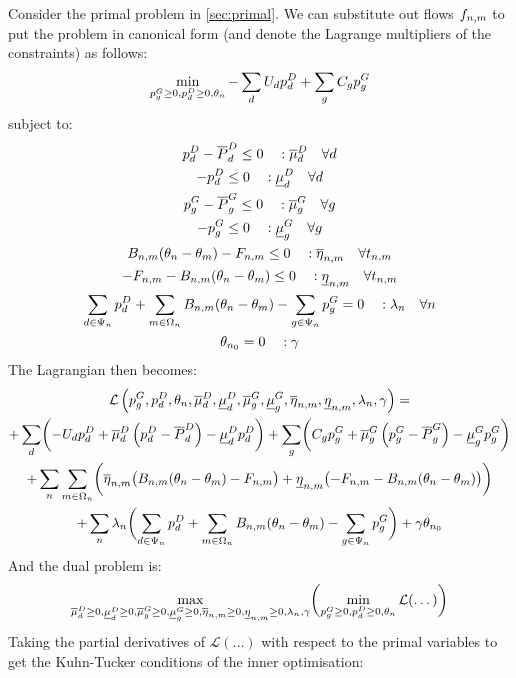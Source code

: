 \documentclass[11pt,a4paper]{article}
\numberwithin{equation}{section}
\begin{document}
Consider the primal problem in \cref{sec:primal}. We can substitute out flows $f_{n,m}$ to put the problem in canonical form (and denote the Lagrange multipliers of the constraints) as follows:
\begin{equation}
\min_{p^G_g \geq 0 ,p^D_d \geq 0,\theta_n} - \sum_d U_d p^D_d + \sum_g C_g p^G_g 
\end{equation}
subject to:
\begin{gather}
p^D_d - \overline{P}^D_d \leq 0 \quad : \overline{\mu}_d^D \quad \forall d  \label{eq:ineq_a} \\
- p^D_d \leq 0 \quad : \underline{\mu}_d^D \quad \forall d  \\
p^G_g - \overline{P}^G_g \leq 0 \quad : \overline{\mu}_g^G \quad \forall g  \\
- p^G_g \leq 0 \quad : \underline{\mu}_g^G \quad \forall g  \\
B_{n,m}(\theta_n - \theta_m) - F_{n,m} \leq 0 \quad : \overline{\eta}_{n,m} \quad \forall t_{n,m} \\
-F_{n,m} - B_{n,m}(\theta_n - \theta_m) \leq 0 \quad : \underline{\eta}_{n,m} \quad \forall t_{n,m} \label{eq:ineq_z} \\
\sum_{d \in \Psi_n} p^D_d + \sum_{m \in \Omega_n} B_{n,m}(\theta_n - \theta_m) - \sum_{g \in \Psi_n} p^G_g = 0 \quad : \lambda_n \quad \forall n  \label{eq:balance} \\
\theta_{n_0} = 0 \quad : \gamma \label{eq:theta}
\end{gather}
The Lagrangian then becomes:
\begin{multline}
\mathcal{L} \left( p^G_g, p^D_d, \theta_n, \overline{\mu}_d^D, \underline{\mu}_d^D, \overline{\mu}_g^G, \underline{\mu}_g^G, \overline{\eta}_{n,m}, \underline{\eta}_{n,m}, \lambda_n, \gamma  \right) = \\
+ \sum_d \biggl( - U_d p^D_d + \overline{\mu}_d^D \left( p^D_d - \overline{P}^D_d \right) - \underline{\mu}_d^D p^D_d \biggr)
+ \sum_g \biggl( C_g p^G_g + \overline{\mu}_g^G \left( p^G_g - \overline{P}^G_g \right) - \underline{\mu}_g^G p^G_g \biggr) \\
+ \sum_n \sum_{m \in \Omega_n} \biggl( \overline{\eta}_{n,m} \bigl(B_{n,m}(\theta_n - \theta_m) - F_{n,m} \bigr) 
+ \underline{\eta}_{n,m} \bigl(-F_{n,m} - B_{n,m}(\theta_n - \theta_m) \bigr) \biggr) \\
+ \sum_n \lambda_n \biggl( \sum_{d \in \Psi_n} p^D_d + \sum_{m \in \Omega_n} B_{n,m}(\theta_n - \theta_m) - \sum_{g \in \Psi_n} p^G_g \biggr) 
+ \gamma \theta_{n_0}
\end{multline}
And the dual problem is:
\begin{equation}
\max_{\overline{\mu}_d^D \geq 0, \underline{\mu}_d^D \geq 0, \overline{\mu}_g^G \geq 0, \underline{\mu}_g^G \geq 0, \overline{\eta}_{n,m} \geq 0, \underline{\eta}_{n,m} \geq 0, \lambda_n, \gamma} \biggl( \min_{p^G_g \geq 0 ,p^D_d \geq 0,\theta_n} \mathcal{L} (\dots) \biggr)
\end{equation}
Taking the partial derivatives of $\mathcal{L}(\dots)$ with respect to the primal variables to get the Kuhn-Tucker conditions of the inner optimisation:
\end{document}
